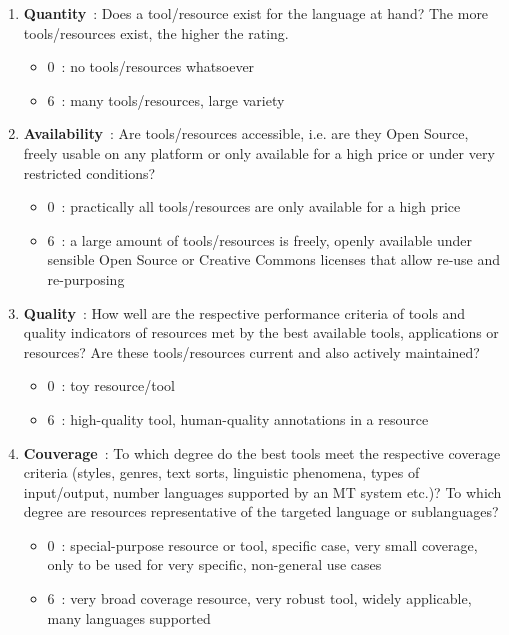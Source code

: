 \begin{multicols}{2}
\begin{enumerate}
\item {\bf Quantity}~: Does a tool/resource exist for the language at hand? The more tools/resources exist, the higher the rating.
      \begin{itemize}
      \item 0~: no tools/resources whatsoever
      \item 6~: many tools/resources, large variety
      \end{itemize}

\item {\bf Availability}~: Are tools/resources accessible, i.e. are they Open Source, freely usable on any platform or only available for a high price or under very restricted conditions?
      \begin{itemize}
      \item 0~: practically all tools/resources are only available for a high price
      \item 6~: a large amount of tools/resources is freely, openly available under sensible Open Source or Creative Commons licenses that allow re-use and re-purposing
      \end{itemize}

\item {\bf Quality}~: How well are the respective performance criteria of tools and quality indicators of resources met by the best available tools, applications or resources? Are these tools/resources current and also actively maintained?
      \begin{itemize}
      \item 0~: toy resource/tool
      \item 6~: high-quality tool, human-quality annotations in a resource
      \end{itemize}

\item {\bf Couverage}~: To which degree do the best tools meet the respective coverage criteria (styles, genres, text sorts, linguistic phenomena, types of input/output, number languages supported by an MT system etc.)? To which degree are resources representative of the targeted language or sublanguages?
      \begin{itemize}
      \item 0~: special-purpose resource or tool, specific case, very small coverage, only to be used for very specific, non-general use cases
      \item 6~: very broad coverage resource, very robust tool, widely applicable, many languages supported
      \end{itemize}


\end{enumerate}
\end{multicols}
